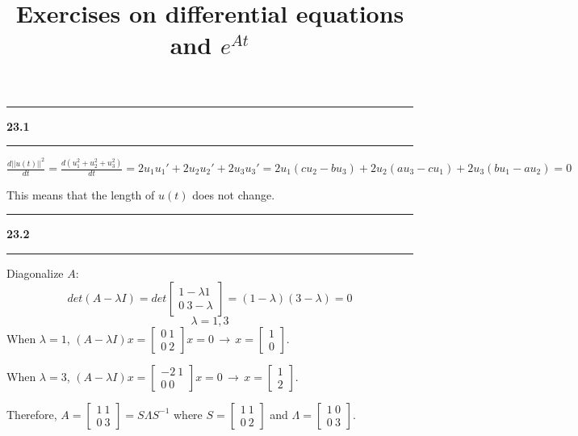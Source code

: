 \documentclass[11pt]{article}
\newcommand\question[2]{\vspace{.25in}\hrule\textbf{#1 #2}\vspace{.5em}\hrule\vspace{.10in}}
\begin{document}
\raggedright
\newcommand\NAME{Haiying Cui}  %
\newcommand\ANDREWID{Christy}     %
\newcommand\HWNUM{23}              %

\title{Exercises on differential equations and \(e^{At}\)}
\maketitle

\question{23.1}{}
\(\frac{d||u(t)||^2}{dt} = \frac{d(u_1^2 + u_2^2 + u_3^2)}{dt} = 2u_1u_1' + 2u_2u_2' + 2u_3u_3' = 2u_1(cu_2-bu_3) + 2u_2(au_3 - cu_1) + 2u_3(bu_1-au_2) = 0\)

This means that the length of \(u(t)\) does not change. 

\question{23.2}{}
Diagonalize \(A\):
$$det (A-\lambda I) = det \begin{bmatrix} 1-\lambda 1 \\ 0 \ 3-\lambda \end{bmatrix} = (1-\lambda)(3-\lambda) = 0$$
$$\lambda = 1, 3$$
When \(\lambda = 1\), \((A-\lambda I)x = \begin{bmatrix} 0 \ 1 \\ 0 \ 2 \end{bmatrix} x = 0 \,\to\, x = \begin{bmatrix} 1 \\ 0 \end{bmatrix}\).

When \(\lambda = 3\), \((A-\lambda I)x = \begin{bmatrix} -2 \ 1 \\ 0 \ 0 \end{bmatrix} x = 0 \,\to\, x = \begin{bmatrix} 1 \\ 2 \end{bmatrix}\).

Therefore, \(A = \begin{bmatrix} 1 \ 1 \\ 0 \ 3 \end{bmatrix} = S\Lambda S^{-1}\) where \(S = \begin{bmatrix} 1 \ 1 \\ 0 \ 2 \end{bmatrix}\) and \(\Lambda = \begin{bmatrix} 1 \ 0 \\ 0 \ 3 \end{bmatrix}\).
\end{document}
